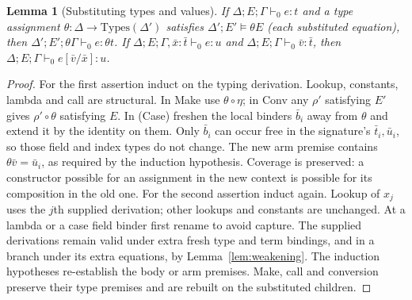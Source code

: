 \documentclass[11pt]{article}
\newtheorem{lemma}[theorem]{Lemma}
\theoremstyle{definition}
\begin{document}
\begin{lemma}[Substituting types and values]\label{lem:substitution}
If $\Delta;E;\Gamma\vdash_0 e:t$ and a type assignment
$\theta:\Delta\to\mathrm{Types}(\Delta')$ satisfies
$\Delta';E'\models\theta E$ (each substituted equation), then
$\Delta';E';\theta\Gamma\vdash_0 e:\theta t$.
If $\Delta;E;\Gamma,\bar x:\bar t\vdash_0 e:u$ and
$\Delta;E;\Gamma\vdash_0\bar v:\bar t$, then
$\Delta;E;\Gamma\vdash_0 e[\bar v/\bar x]:u$.
\end{lemma}
\begin{proof}
For the first assertion induct on the typing derivation. Lookup,
constants, lambda and call are structural. In \textsf{Make} use
$\theta\circ\eta$; in \textsf{Conv} any $\rho'$ satisfying $E'$ gives
$\rho'\circ\theta$ satisfying $E$. In (Case) freshen the local binders
$\bar b_i$ away from $\theta$ and extend it by the identity on them.
Only $\bar b_i$ can occur free in the signature's $\bar t_i,\bar u_i$,
so those field and index types do not change. The new arm premise
contains $\theta\bar v=\bar u_i$, as required by the induction hypothesis.
Coverage is preserved: a constructor possible for an assignment in the
new context is possible for its composition in the old one.
For the second assertion induct again. Lookup of $x_j$ uses the $j$th
supplied derivation; other lookups and constants are unchanged. At a
lambda or a case field binder first rename to avoid capture. The supplied
derivations remain valid under extra fresh type and term bindings, and
in a branch under its extra equations, by Lemma~\ref{lem:weakening}.
The induction hypotheses re-establish
the body or arm premises. \textsf{Make}, call and conversion preserve
their type premises and are rebuilt on the substituted children.
\end{proof}
\end{document}
